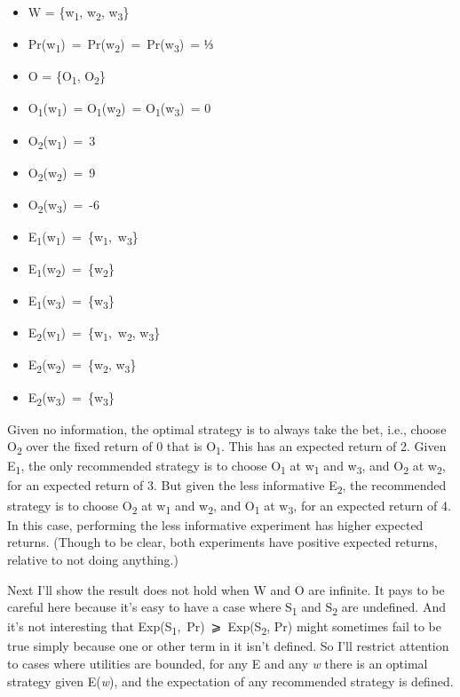 \documentclass[
  12pt,
  letterpaper,
  DIV=11,
  numbers=noendperiod]{scrartcl}
\providecommand{\tightlist}{%
  \setlength{\itemsep}{0pt}\setlength{\parskip}{0pt}}\usepackage{longtable,booktabs,array}
\begin{document}
\begin{itemize}
\tightlist
\item
  W = \{w\textsubscript{1}, w\textsubscript{2}, w\textsubscript{3}\}
\item
  Pr(w\textsubscript{1})~=~Pr(w\textsubscript{2})~=~Pr(w\textsubscript{3})~=
  ⅓
\item
  O = \{O\textsubscript{1}, O\textsubscript{2}\}
\item
  O\textsubscript{1}(w\textsubscript{1})~=
  O\textsubscript{1}(w\textsubscript{2})~=
  O\textsubscript{1}(w\textsubscript{3})~= 0
\item
  O\textsubscript{2}(w\textsubscript{1})~=~3
\item
  O\textsubscript{2}(w\textsubscript{2})~=~9
\item
  O\textsubscript{2}(w\textsubscript{3})~=~-6
\item
  E\textsubscript{1}(w\textsubscript{1})~=~\{w\textsubscript{1},~w\textsubscript{3}\}
\item
  E\textsubscript{1}(w\textsubscript{2})~=~\{w\textsubscript{2}\}
\item
  E\textsubscript{1}(w\textsubscript{3})~=~\{w\textsubscript{3}\}
\item
  E\textsubscript{2}(w\textsubscript{1})~=~\{w\textsubscript{1},~w\textsubscript{2},
  w\textsubscript{3}\}
\item
  E\textsubscript{2}(w\textsubscript{2})~=~\{w\textsubscript{2},
  w\textsubscript{3}\}
\item
  E\textsubscript{2}(w\textsubscript{3})~=~\{w\textsubscript{3}\}
\end{itemize}

Given no information, the optimal strategy is to always take the bet,
i.e., choose O\textsubscript{2} over the fixed return of 0 that is
O\textsubscript{1}. This has an expected return of 2. Given
E\textsubscript{1}, the only recommended strategy is to choose
O\textsubscript{1} at w\textsubscript{1} and w\textsubscript{3}, and
O\textsubscript{2} at w\textsubscript{2}, for an expected return of 3.
But given the less informative E\textsubscript{2}, the recommended
strategy is to choose O\textsubscript{2} at w\textsubscript{1} and
w\textsubscript{2}, and O\textsubscript{1} at w\textsubscript{3}, for an
expected return of 4. In this case, performing the less informative
experiment has higher expected returns. (Though to be clear, both
experiments have positive expected returns, relative to not doing
anything.)

Next I'll show the result does not hold when W and O are infinite. It
pays to be careful here because it's easy to have a case where
S\textsubscript{1} and S\textsubscript{2} are undefined. And it's not
interesting that Exp(S\textsubscript{1},~Pr)~⩾~Exp(S\textsubscript{2},
Pr) might sometimes fail to be true simply because one or other term in
it isn't defined. So I'll restrict attention to cases where utilities
are bounded, for any E and any \emph{w} there is an optimal strategy
given E(\emph{w}), and the expectation of any recommended strategy is
defined.
\end{document}
